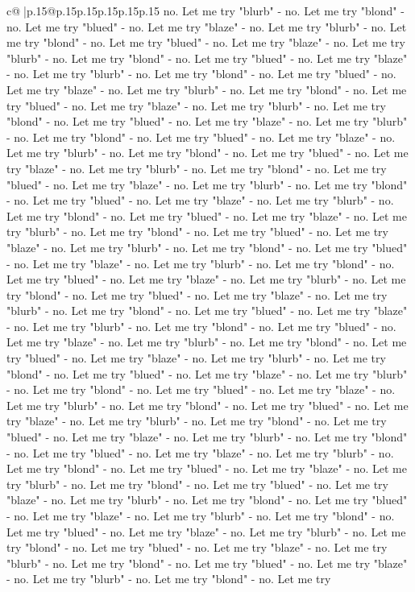 \documentclass{article}
\begin{document}
{\begin{supertabular}{c@{$\;$}|p{.15\linewidth}@{}p{.15\linewidth}p{.15\linewidth}p{.15\linewidth}p{.15\linewidth}p{.15\linewidth}}
{{{no. Let me try "blurb" {-} no. Let me try "blond" {-} no. Let me try "blued" {-} no. Let me try "blaze" {-} no. Let me try "blurb" {-} no. Let me try "blond" {-} no. Let me try "blued" {-} no. Let me try "blaze" {-} no. Let me try "blurb" {-} no. Let me try "blond" {-} no. Let me try "blued" {-} no. Let me try "blaze" {-} no. Let me try "blurb" {-} no. Let me try "blond" {-} no. Let me try "blued" {-} no. Let me try "blaze" {-} no. Let me try "blurb" {-} no. Let me try "blond" {-} no. Let me try "blued" {-} no. Let me try "blaze" {-} no. Let me try "blurb" {-} no. Let me try "blond" {-} no. Let me try "blued" {-} no. Let me try "blaze" {-} no. Let me try "blurb" {-} no. Let me try "blond" {-} no. Let me try "blued" {-} no. Let me try "blaze" {-} no. Let me try "blurb" {-} no. Let me try "blond" {-} no. Let me try "blued" {-} no. Let me try "blaze" {-} no. Let me try "blurb" {-} no. Let me try "blond" {-} no. Let me try "blued" {-} no. Let me try "blaze" {-} no. Let me try "blurb" {-} no. Let me try "blond" {-} no. Let me try "blued" {-} no. Let me try "blaze" {-} no. Let me try "blurb" {-} no. Let me try "blond" {-} no. Let me try "blued" {-} no. Let me try "blaze" {-} no. Let me try "blurb" {-} no. Let me try "blond" {-} no. Let me try "blued" {-} no. Let me try "blaze" {-} no. Let me try "blurb" {-} no. Let me try "blond" {-} no. Let me try "blued" {-} no. Let me try "blaze" {-} no. Let me try "blurb" {-} no. Let me try "blond" {-} no. Let me try "blued" {-} no. Let me try "blaze" {-} no. Let me try "blurb" {-} no. Let me try "blond" {-} no. Let me try "blued" {-} no. Let me try "blaze" {-} no. Let me try "blurb" {-} no. Let me try "blond" {-} no. Let me try "blued" {-} no. Let me try "blaze" {-} no. Let me try "blurb" {-} no. Let me try "blond" {-} no. Let me try "blued" {-} no. Let me try "blaze" {-} no. Let me try "blurb" {-} no. Let me try "blond" {-} no. Let me try "blued" {-} no. Let me try "blaze" {-} no. Let me try "blurb" {-} no. Let me try "blond" {-} no. Let me try "blued" {-} no. Let me try "blaze" {-} no. Let me try "blurb" {-} no. Let me try "blond" {-} no. Let me try "blued" {-} no. Let me try "blaze" {-} no. Let me try "blurb" {-} no. Let me try "blond" {-} no. Let me try "blued" {-} no. Let me try "blaze" {-} no. Let me try "blurb" {-} no. Let me try "blond" {-} no. Let me try "blued" {-} no. Let me try "blaze" {-} no. Let me try "blurb" {-} no. Let me try "blond" {-} no. Let me try "blued" {-} no. Let me try "blaze" {-} no. Let me try "blurb" {-} no. Let me try "blond" {-} no. Let me try "blued" {-} no. Let me try "blaze" {-} no. Let me try "blurb" {-} no. Let me try "blond" {-} no. Let me try "blued" {-} no. Let me try "blaze" {-} no. Let me try "blurb" {-} no. Let me try "blond" {-} no. Let me try "blued" {-} no. Let me try "blaze" {-} no. Let me try "blurb" {-} no. Let me try "blond" {-} no. Let me try "blued" {-} no. Let me try "blaze" {-} no. Let me try "blurb" {-} no. Let me try "blond" {-} no. Let me try "blued" {-} no. Let me try "blaze" {-} no. Let me try "blurb" {-} no. Let me try "blond" {-} no. Let me try "blued" {-} no. Let me try "blaze" {-} no. Let me try "blurb" {-} no. Let me try "blond" {-} no. Let me try }}}
\end{supertabular}}
\end{document}
